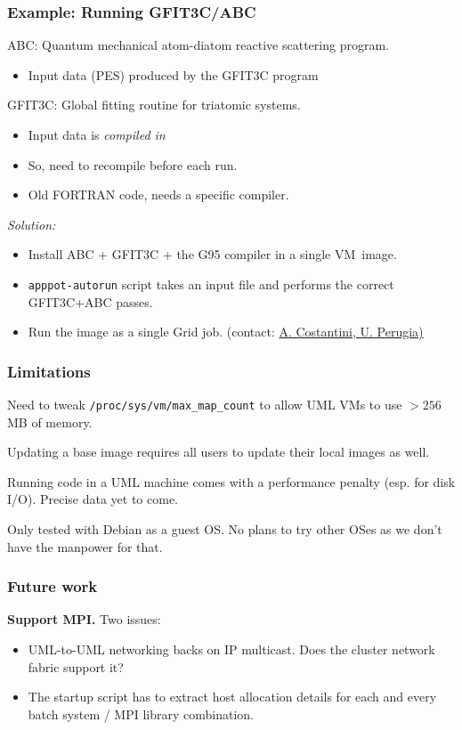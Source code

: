 \documentclass{beamer}
\begin{document}
\begin{frame}
  \frametitle{Example: Running GFIT3C/ABC}

  ABC: Quantum mechanical atom-diatom reactive scattering program.
  \begin{itemize}
  \item Input data (PES) produced by the GFIT3C program
  \end{itemize}

  \+ GFIT3C: Global fitting routine for triatomic systems.
  \begin{itemize}
  \item Input data is \emph{compiled in}
  \item So, need to recompile before each run.
  \item Old FORTRAN code, needs a specific compiler.
  \end{itemize}

  \+
  \emph{Solution:}
  \begin{itemize}
  \item Install ABC + GFIT3C + the G95 compiler in a single
    VM~image.
  \item \texttt{apppot-autorun} script takes an input file and
    performs the correct GFIT3C+ABC passes.
  \item Run the image as a single Grid job.
    {\hfill\tiny (contact: \href{mailto:alex.costantini@gmail.com}{A. Costantini, U. Perugia)}}
  \end{itemize}
\end{frame}


\begin{frame}
  \frametitle{Limitations}
  \label{sec:20}
  Need to tweak \texttt{/proc/sys/vm/max\_map\_count} to allow UML VMs
  to use $>256$MB of memory.

  \+
  Updating a base image requires all users to update their local
  images as well.

  \+
  Running code in a UML machine comes with a performance penalty
  (esp. for disk I/O).  Precise data yet to come.

  \+
  Only tested with Debian as a guest OS.  No plans to try other OSes
  as we don't have the manpower for that.
  \end{frame}


\begin{frame}
  \frametitle{Future work}
  \label{sec:21}
  \textbf{Support MPI.}  Two issues:
  \begin{itemize}
  \item UML-to-UML networking backs on IP multicast. Does the cluster
    network fabric support it?
  \item The startup script has to extract host allocation details
    for each and every batch system / MPI library combination.
  \end{itemize}
\end{frame}
\end{document}
